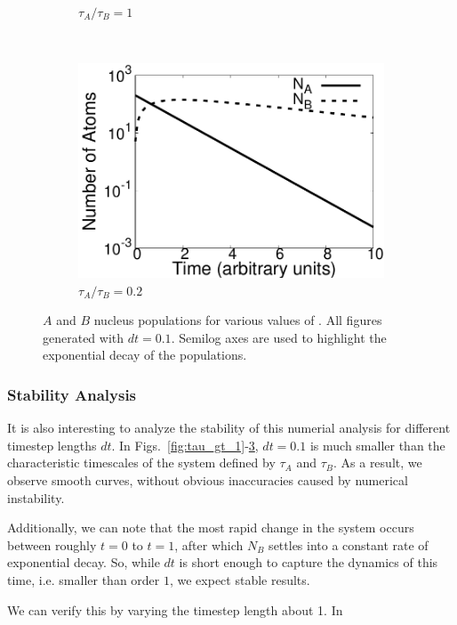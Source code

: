 \documentclass[pra,twocolumn,showpacs,amsmath,amssymb]{revtex4-1}
\begin{document}
\begin{figure}
\begin{subfigure}[t]{.7\linewidth}
    \caption{$\tau_A / \tau_B=1$}
    \label{fig:tau_eq_1}
  \end{subfigure}
~
  \begin{subfigure}[t]{.7\linewidth}
    \includegraphics[width=\linewidth]{t_lt_1.pdf}
    \caption{$\tau_A / \tau_B=0.2$}
    \label{fig:tau_lt_1}
  \end{subfigure}

  \caption{$A$ and $B$ nucleus populations for various values of \trel.
  All figures generated with $dt=0.1$. Semilog axes are used to highlight the
  exponential decay of the populations.}
\end{figure}

\subsubsection{Stability Analysis}

It is also interesting to analyze the stability of this numerial analysis for
different timestep lengths $dt$. In Figs.~\ref{fig:tau_gt_1}-\ref{fig:tau_lt_1},
$dt=0.1$ is much smaller than the characteristic timescales of the system defined
by $\tau_A$ and $\tau_B$. As a result, we observe smooth curves, without obvious
inaccuracies caused by numerical instability.

Additionally, we can note that the most rapid change in the system occurs between
roughly $t=0$ to $t=1$, after which $N_B$ settles into a constant
rate of exponential decay. So, while $dt$ is short enough to capture the dynamics
of this time, i.e. smaller than order $1$, we expect stable results.

We can verify this by varying the timestep length about 1. In
\end{document}

